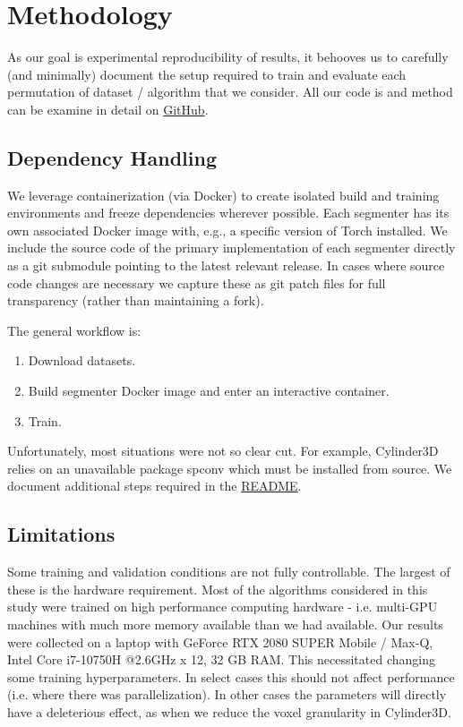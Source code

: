 \section{Methodology}
\label{chap:methodology}

As our goal is experimental reproducibility of results, it behooves us to carefully (and minimally) document the setup required to train and evaluate each permutation of dataset / algorithm that we consider. All our code is and method can be examine in detail on \href{https://github.com/danielmohansahu/benchmarking-3d-semantic-segmentation}{GitHub}.

\subsection{Dependency Handling}
\label{dependency-handling}

We leverage containerization (via Docker) to create isolated build and training environments and freeze dependencies wherever possible. Each segmenter has its own associated Docker image with, e.g., a specific version of Torch installed. We include the source code of the primary implementation of each segmenter directly as a git submodule pointing to the latest relevant release. In cases where source code changes are necessary we capture these as git patch files for full transparency (rather than maintaining a fork).

The general workflow is:
\begin{enumerate}
  \item Download datasets.
  \item Build segmenter Docker image and enter an interactive container.
  \item Train.
\end{enumerate}

Unfortunately, most situations were not so clear cut. For example, Cylinder3D relies on an unavailable package spconv which must be installed from source. We document additional steps required in the \href{https://github.com/danielmohansahu/benchmarking-3d-semantic-segmentation/blob/main/README.md}{README}.

\subsection{Limitations}
\label{limitations}

Some training and validation conditions are not fully controllable. The largest of these is the hardware requirement. Most of the algorithms considered in this study were trained on high performance computing hardware - i.e. multi-GPU machines with much more memory available than we had available. Our results were collected on a laptop with GeForce RTX 2080 SUPER Mobile / Max-Q, Intel Core i7-10750H @2.6GHz x 12, 32 GB RAM. This necessitated changing some training hyperparameters. In select cases this should not affect performance (i.e. where there was parallelization). In other cases the parameters will directly have a deleterious effect, as when we reduce the voxel granularity in Cylinder3D.

